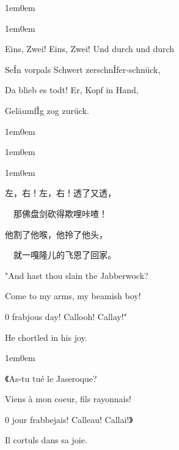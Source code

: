 \documentclass[
  12pt,
  twoside,
  openright,
  oldfontcommands,
]{memoir}
\begin{document}
\hfill\break

\begin{adjustwidth}{1em}{0em}

\begin{adjustwidth}{1em}{0em}

Eins, Zwei! Eins, Zwei! Und durch und durch

SeÎn vorpals Schwert zerschnÎfer-schnück,

Da blieb es todt! Er, Kopf in Hand,

GeläumfÎg zog zurück.

\end{adjustwidth}

\end{adjustwidth}

\hfill\break

\begin{adjustwidth}{1em}{0em}

\begin{adjustwidth}{1em}{0em}

\begin{adjustwidth}{1em}{0em}

左，右！左，右！透了又透，

　那佛盘剑砍得欺哩咔喳！

他割了他喉，他拎了他头，

　就一嘎隆儿的飞恩了回家。

\end{adjustwidth}

\end{adjustwidth}

\end{adjustwidth}

\hfill\break

"And hast thou slain the Jabberwock?

Come to my arms, my beamish boy!

0 frabjous day! Callooh! Callay!"

He chortled in his joy.

\hfill\break

\begin{adjustwidth}{1em}{0em}

《As-tu tué le Jaseroque?

Viens à mon coeur, fils rayonnais!

0 jour frabbejais! Calleau! Callai!》

Il cortuls dans sa joie.

\end{adjustwidth}
\end{document}
